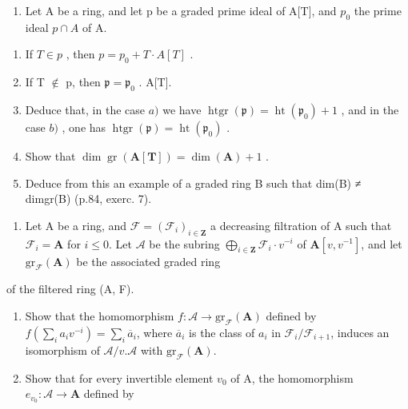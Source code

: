 
\begin{enumerate}
\def\labelenumi{\arabic{enumi})}
\tightlist
\item
  Let A be a ring, and let p be a graded prime ideal of A{[}T{]}, and \(p_{0}\) the prime ideal \(p \cap A\) of A.
\end{enumerate}

\begin{enumerate}
\def\labelenumi{\alph{enumi})}
\item
  If \(T \in p\) , then \(p = p_{0} + T \cdot A[T]\) .
\item
  If T \(\notin\) p, then \(\mathfrak{p} = \mathfrak{p}_0\) . A{[}T{]}.
\item
  Deduce that, in the case \(a)\) we have \(\operatorname{htgr}(\mathfrak{p}) = \operatorname{ht}(\mathfrak{p}_0) + 1\) , and in the case \(b)\) , one has \(\operatorname{htgr}(\mathfrak{p}) = \operatorname{ht}(\mathfrak{p}_0)\) .
\item
  Show that \(\dim \operatorname{gr}(\mathbf{A}[\mathbf{T}]) = \dim (\mathbf{A}) + 1\) .
\item
  Deduce from this an example of a graded ring B such that dim(B) ≠ dimgr(B) (p.84, exerc. 7).
\end{enumerate}

\begin{enumerate}
\def\labelenumi{\arabic{enumi})}
\setcounter{enumi}{1}
\tightlist
\item
  Let A be a ring, and \(\mathcal{F} = (\mathcal{F}_i)_{i \in \mathbf{Z}}\) a decreasing filtration of A such that \(\mathcal{F}_i = \mathbf{A}\) for \(i \leqslant 0\). Let \(\mathcal{A}\) be the subring \(\bigoplus_{i \in \mathbf{Z}} \mathcal{F}_i \cdot v^{-i}\) of \(\mathbf{A}[v, v^{-1}]\), and let \(\mathrm{gr}_{\mathcal{F}}(\mathbf{A})\) be the associated graded ring
\end{enumerate}

of the filtered ring (A, F).

\begin{enumerate}
\def\labelenumi{\alph{enumi})}
\item
  Show that the homomorphism \(f: \mathcal{A} \to \mathrm{gr}_{\mathcal{F}}(\mathbf{A})\) defined by \(f\left(\sum_{i} a_i v^{-i}\right) = \sum_{i} \overline{a}_i\), where \(\overline{a}_i\) is the class of \(a_i\) in \(\mathcal{F}_i / \mathcal{F}_{i+1}\), induces an isomorphism of \(\mathcal{A}/v. \mathcal{A}\) with \(\mathrm{gr}_{\mathcal{F}}(\mathbf{A})\).
\item
  Show that for every invertible element \(v_{0}\) of A, the homomorphism \(e_{v_{0}}: \mathcal{A} \to \mathbf{A}\) defined by
\end{enumerate}

